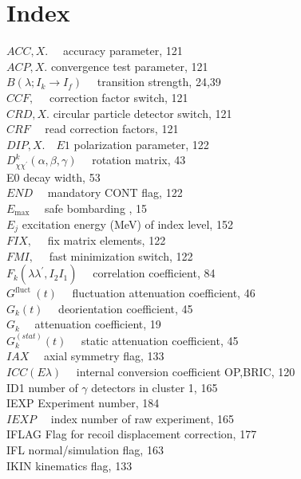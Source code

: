 \documentclass[10pt]{article}
\begin{document}
\section*{Index}
$A C C, X . \quad$ accuracy parameter, 121\\
$A C P, X$. convergence test parameter, 121\\
$B\left(\lambda ; I_{k} \rightarrow I_{f}\right) \quad$ transition strength, 24,39\\
$C C F, \quad$ correction factor switch, 121\\
$C R D, X$. circular particle detector switch, 121\\
$C R F \quad$ read correction factors, 121\\
$D I P, X . \quad E 1$ polarization parameter, 122\\
$D_{\chi \chi^{\prime}}^{k}(\alpha, \beta, \gamma) \quad$ rotation matrix, 43\\
E0 decay width, 53\\
$E N D \quad$ mandatory CONT flag, 122\\
$E_{\max } \quad$ safe bombarding , 15\\
$E_{j}$ excitation energy (MeV) of index level, 152\\
$F I X, \quad$ fix matrix elements, 122\\
$F M I, \quad$ fast minimization switch, 122\\
$F_{k}\left(\lambda \lambda^{\prime}, I_{2} I_{1}\right) \quad$ correlation coefficient, 84\\
$G^{\text {fluct }}(t) \quad$ fluctuation attenuation coefficient, 46\\
$G_{k}(t) \quad$ deorientation coefficient, 45\\
$G_{k} \quad$ attenuation coefficient, 19\\
$G_{k}^{(s t a t)}(t) \quad$ static attenuation coefficient, 45\\
$I A X \quad$ axial symmetry flag, 133\\
$I C C(E \lambda) \quad$ internal conversion coefficient OP,BRIC, 120\\
ID1 number of $\gamma$ detectors in cluster 1, 165\\
IEXP Experiment number, 184\\
$I E X P \quad$ index number of raw experiment, 165\\
IFLAG Flag for recoil displacement correction, 177\\
IFL normal/simulation flag, 163\\
IKIN kinematics flag, 133\\
\end{document}

